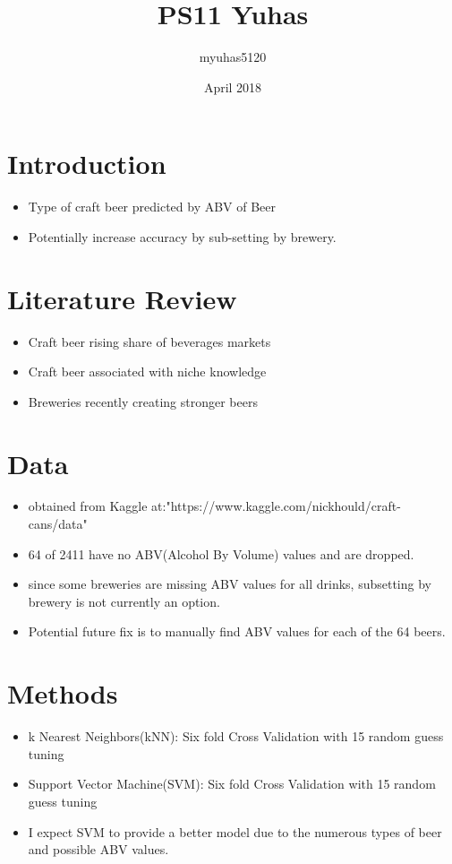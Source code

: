 \documentclass{article}
\title{PS11 Yuhas}
\author{myuhas5120 }
\date{April 2018}
\begin{document}
\maketitle

\section{Introduction}
\begin{itemize}
    \item Type of craft beer predicted by ABV of Beer
    \item Potentially increase accuracy by sub-setting by brewery.
\end{itemize}

\section{Literature Review}
\begin{itemize}
    \item Craft beer rising share of beverages markets
    \item Craft beer associated with niche knowledge
    \item Breweries recently creating stronger beers
\end{itemize}

\section{Data}
\begin{itemize}
    \item obtained from Kaggle 
at:"https://www.kaggle.com/nickhould/craft-cans/data"
    \item 64 of 2411 have no ABV(Alcohol By Volume) values and are 
dropped.
    \item since some breweries are missing ABV values for all drinks, 
subsetting by brewery is not currently an option.
    \item Potential future fix is to manually find ABV values for each 
of the 64 beers.
\end{itemize}

\section{Methods}
\begin{itemize}
    \item k Nearest Neighbors(kNN): Six fold Cross Validation with 15 
random guess tuning
    \item Support Vector Machine(SVM): Six fold Cross Validation with 15 
random guess tuning
    \item I expect SVM to provide a better model due to the numerous 
types of beer and possible ABV values.
\end{itemize}
\end{document}
